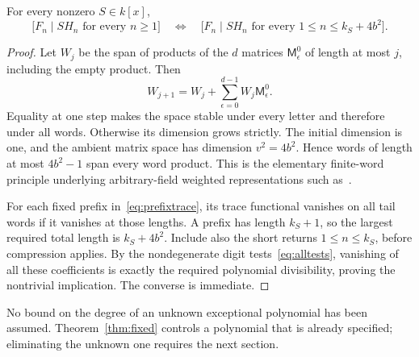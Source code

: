 \begin{theorem}\label{thm:fixed}
For every nonzero $S\in k[x]$,
\begin{equation}\label{eq:fixed}
 \bigl[F_n\mid SH_n\text{ for every }n\ge1\bigr]
 \quad\Longleftrightarrow\quad
 \bigl[F_n\mid SH_n\text{ for every }1\le n\le k_S+4b^2\bigr].
\end{equation}
\end{theorem}
\begin{proof}
Let $W_j$ be the span of products of the $d$ matrices
$\mathsf M^0_\epsilon$ of length at most $j$, including the empty
product. Then
\[
 W_{j+1}=W_j+\sum_{\epsilon=0}^{d-1}W_j\mathsf M^0_\epsilon.
\]
Equality at one step makes the space stable under every letter and
therefore under all words. Otherwise its dimension grows strictly.
The initial dimension is one, and the ambient matrix space has
dimension $v^2=4b^2$. Hence words of length at most $4b^2-1$
span every word product. This is the elementary finite-word
principle underlying arbitrary-field weighted representations
such as~\cite[Proposition~3.1]{Kiefer2013}.

For each fixed prefix in~\eqref{eq:prefixtrace}, its trace
functional vanishes on all tail words if it vanishes at those
lengths. A prefix has length $k_S+1$, so the largest required
total length is $k_S+4b^2$. Include also the short returns
$1\le n\le k_S$, before compression applies. By the
nondegenerate digit tests~\eqref{eq:alltests}, vanishing of all
these coefficients is exactly the required polynomial
divisibility, proving the nontrivial implication. The converse
is immediate.
\end{proof}

No bound on the degree of an unknown exceptional polynomial has
been assumed. Theorem~\ref{thm:fixed} controls a polynomial that
is already specified; eliminating the unknown one requires the
next section.
